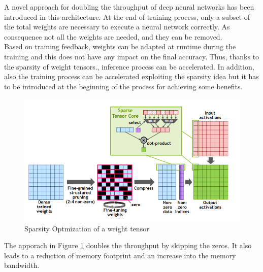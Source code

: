 A novel approach for doubling the throughput of deep neural networks has been introduced in this architecture. At the end of training process, only a subset of the total weights are necessary to execute a neural network correctly. As consequence not all the weights are needed, and they can be removed.\\
Based on training feedback, weights can be adapted at runtime during the training and this does not have any impact on the final accuracy. Thus, thanks to the sparsity of weight tensors., inference process can be accelerated. In addition, also the training process can be accelerated exploiting the sparsity idea but it has to be introduced at the beginning of the process for achieving some benefits.

\begin{figure}[!htbp]
\centering
\captionsetup{justification=centering}
\includegraphics[scale=0.4]{./figure/sparsity.png}
\caption{Sparsity Optmization of a weight tensor \cite{paper:41}}
\label{fig:spa}
\end{figure}
The apporach in Figure \ref{fig:spa} doubles the throughput by skipping the zeros. It also leads to a reduction of memory footprint and an increase into the memory bandwidth.\\

